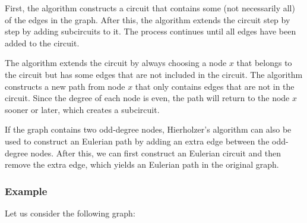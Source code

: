 First, the algorithm constructs a circuit that contains
some (not necessarily all) of the edges in the graph.
After this, the algorithm extends the circuit
step by step by adding subcircuits to it.
The process continues until all edges have been added
to the circuit.

The algorithm extends the circuit by always choosing
a node $x$ that belongs to the circuit but has
some edges that are not included in the circuit.
The algorithm constructs a new path from node $x$
that only contains edges that are not in the circuit.
Since the degree of each node is even,
the path will return to the node $x$ sooner or later,
which creates a subcircuit.

If the graph contains two odd-degree nodes,
Hierholzer's algorithm can also be used to
construct an Eulerian path by adding an
extra edge between the odd-degree nodes.
After this, we can first construct an Eulerian circuit
and then remove the extra edge,
which yields an Eulerian path in the original graph.

\subsubsection{Example}

\begin{samepage}
Let us consider the following graph:
\begin{center}
\end{center}
\end{samepage}

